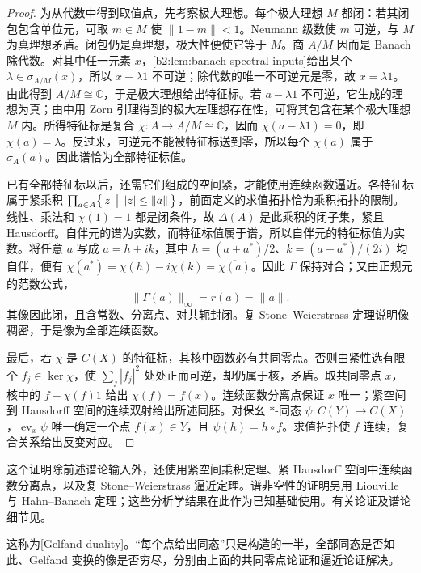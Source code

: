 \begin{proof}
	为从代数中得到取值点，先考察极大理想。每个极大理想 \(M\) 都闭：若其闭包包含单位元，可取 \(m\in M\) 使 \(\|1-m\|<1\)。Neumann 级数使 \(m\) 可逆，与 \(M\) 为真理想矛盾。闭包仍是真理想，极大性便使它等于 \(M\)。商 \(A/M\) 因而是 Banach 除代数。对其中任一元素 \(x\)，\cref{b2:lem:banach-spectral-inputs}给出某个 \(\lambda\in\sigma_{A/M}(x)\)，所以 \(x-\lambda1\) 不可逆；除代数的唯一不可逆元是零，故 \(x=\lambda1\)。由此得到 \(A/M\cong\mathbb C\)，于是极大理想给出特征标。若 \(a-\lambda1\) 不可逆，它生成的理想为真；由中用 Zorn 引理得到的极大左理想存在性，可将其包含在某个极大理想 \(M\) 内。所得特征标是复合 \(\chi:A\to A/M\cong\mathbb C\)，因而 \(\chi(a-\lambda1)=0\)，即 \(\chi(a)=\lambda\)。反过来，可逆元不能被特征标送到零，所以每个 \(\chi(a)\) 属于 \(\sigma_A(a)\)。因此谱恰为全部特征标值。

	已有全部特征标以后，还需它们组成的空间紧，才能使用连续函数逼近。各特征标属于紧乘积 \(\prod_{a\in A}\bigl\{\,z\,\bigm|\,|z|\le\|a\|\,\bigr\}\)，前面定义的求值拓扑恰为乘积拓扑的限制。线性、乘法和 \(\chi(1)=1\) 都是闭条件，故 \(\Delta(A)\) 是此乘积的闭子集，紧且 Hausdorff。自伴元的谱为实数，而特征标值属于谱，所以自伴元的特征标值为实数。将任意 \(a\) 写成 \(a=h+ik\)，其中 \(h=(a+a^*)/2\)、\(k=(a-a^*)/(2i)\) 均自伴，便有 \(\chi(a^*)=\chi(h)-i\chi(k)=\overline{\chi(a)}\)。因此 \(\Gamma\) 保持对合；又由正规元的范数公式，
	\[
		\|\Gamma(a)\|_\infty=r(a)=\|a\|.
	\]
	其像因此闭，且含常数、分离点、对共轭封闭。复 Stone--Weierstrass 定理说明像稠密，于是像为全部连续函数。

	最后，若 \(\chi\) 是 \(C(X)\) 的特征标，其核中函数必有共同零点。否则由紧性选有限个 \(f_j\in\ker\chi\)，使 \(\sum_j|f_j|^2\) 处处正而可逆，却仍属于核，矛盾。取共同零点 \(x\)，核中的 \(f-\chi(f)1\) 给出 \(\chi(f)=f(x)\)。连续函数分离点保证 \(x\) 唯一；紧空间到 Hausdorff 空间的连续双射给出所述同胚。对保幺 \(*\)-同态 \(\psi:C(Y)\to C(X)\)，\(\operatorname{ev}_x\psi\) 唯一确定一个点 \(f(x)\in Y\)，且 \(\psi(h)=h\circ f\)。求值拓扑使 \(f\) 连续，复合关系给出反变对应。
\end{proof}

这个证明除前述谱论输入外，还使用紧空间乘积定理、紧 Hausdorff 空间中连续函数分离点，以及复 Stone--Weierstrass 逼近定理。谱非空性的证明另用 Liouville 与 Hahn--Banach 定理；这些分析学结果在此作为已知基础使用。有关论证及谱论细节见\cite[\nopp I.2; II.2.1--II.2.2, Theorems II.2.2.4, II.2.2.6]{Blackadar2017OperatorAlgebrasCorrected}。

\ProseParagraphBreak
这称为[Gelfand duality]。“每个点给出同态”只是构造的一半，全部同态是否如此、Gelfand 变换的像是否穷尽，分别由上面的共同零点论证和逼近论证解决。

